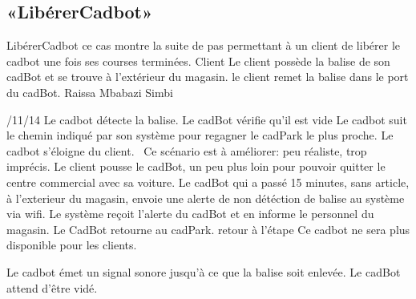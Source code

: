 \subsection{«LibérerCadbot»}
\startCU
\nom LibérerCadbot
\but ce cas montre la suite de pas permettant à un client de libérer le cadbot une fois ses courses terminées.
\acteur Client
\precondition Le client possède la balise de son cadBot et se trouve à l'extérieur du magasin.
\declenchement le client remet la balise dans le port du cadBot.
\auteur Raissa Mbabazi Simbi
\date 7/11/14
\nominal %
\startnominal
\etape[LC:SA2] Le cadbot détecte la balise.
\etape[LC:VIDE] Le cadBot vérifie qu'il est vide
\etape[LC:RETOUR] Le cadbot suit le chemin indiqué par son système pour regagner le cadPark le plus proche.
\stopnominal
\postcondition Le cadbot s'éloigne du client.
\alternatifs
\TODO\ Ce scénario est à améliorer: peu réaliste, trop imprécis.
\startalternatif[LC:SA2] %
\etape Le client pousse le cadBot, un peu plus loin pour pouvoir quitter le centre commercial avec sa voiture.
\etape Le cadBot qui a passé 15 minutes, sans article, à l'exterieur du magasin, envoie une alerte de non détéction de balise au système via wifi.
\etape Le système reçoit l'alerte du cadBot et en informe le personnel du magasin.
\etape Le CadBot retourne au cadPark.
\etape retour à l'étape \in[LC:RETOUR]
\stopcondition
\postcondition Ce cadbot ne sera plus disponible pour les clients.
\stopalternatif




\exception

\startalternatif[LC:VIDE] %
\etape Le cadbot émet un signal sonore jusqu'à ce que la balise soit enlevée.
\stopcondition
\postcondition Le cadBot attend d'être vidé.
\stopalternatif

\stopCU

